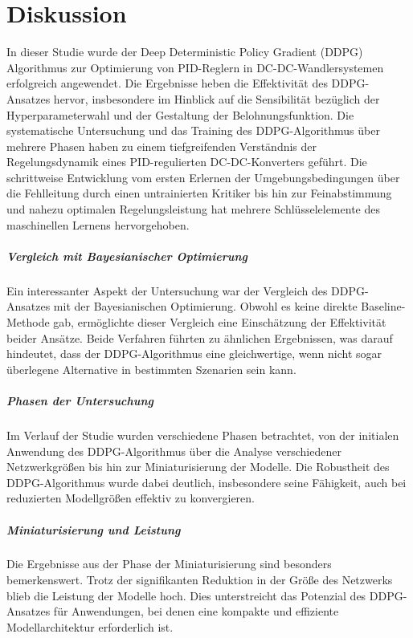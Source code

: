 \chapter{Diskussion}
\label{sec:Discussion}

In dieser Studie wurde der Deep Deterministic Policy Gradient (DDPG) Algorithmus zur Optimierung von PID-Reglern in DC-DC-Wandlersystemen erfolgreich angewendet. Die Ergebnisse heben die Effektivität des DDPG-Ansatzes hervor, insbesondere im Hinblick auf die Sensibilität bezüglich der Hyperparameterwahl und der Gestaltung der Belohnungsfunktion. Die systematische Untersuchung und das Training des DDPG-Algorithmus über mehrere Phasen haben zu einem tiefgreifenden Verständnis der Regelungsdynamik eines PID-regulierten DC-DC-Konverters geführt. Die schrittweise Entwicklung vom ersten Erlernen der Umgebungsbedingungen über die Fehlleitung durch einen untrainierten Kritiker bis hin zur Feinabstimmung und nahezu optimalen Regelungsleistung hat mehrere Schlüsselelemente des maschinellen Lernens hervorgehoben.

\paragraph{Vergleich mit Bayesianischer Optimierung}
Ein interessanter Aspekt der Untersuchung war der Vergleich des DDPG-Ansatzes mit der Bayesianischen Optimierung. Obwohl es keine direkte Baseline-Methode gab, ermöglichte dieser Vergleich eine Einschätzung der Effektivität beider Ansätze. Beide Verfahren führten zu ähnlichen Ergebnissen, was darauf hindeutet, dass der DDPG-Algorithmus eine gleichwertige, wenn nicht sogar überlegene Alternative in bestimmten Szenarien sein kann.

\paragraph{Phasen der Untersuchung}
Im Verlauf der Studie wurden verschiedene Phasen betrachtet, von der initialen Anwendung des DDPG-Algorithmus über die Analyse verschiedener Netzwerkgrößen bis hin zur Miniaturisierung der Modelle. Die Robustheit des DDPG-Algorithmus wurde dabei deutlich, insbesondere seine Fähigkeit, auch bei reduzierten Modellgrößen effektiv zu konvergieren.

\paragraph{Miniaturisierung und Leistung}
Die Ergebnisse aus der Phase der Miniaturisierung sind besonders bemerkenswert. Trotz der signifikanten Reduktion in der Größe des Netzwerks blieb die Leistung der Modelle hoch. Dies unterstreicht das Potenzial des DDPG-Ansatzes für Anwendungen, bei denen eine kompakte und effiziente Modellarchitektur erforderlich ist.

